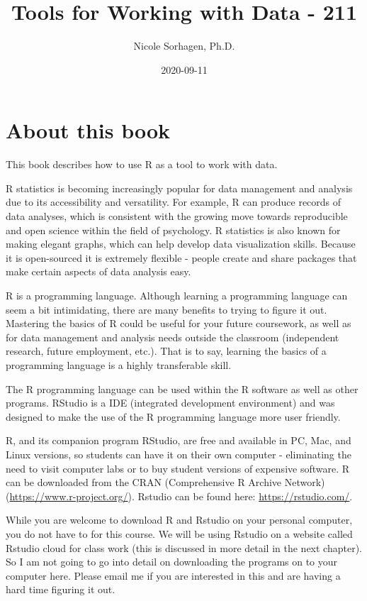\documentclass[
]{book}
\title{Tools for Working with Data - 211}
\author{Nicole Sorhagen, Ph.D.}
\date{2020-09-11}
\begin{document}
\maketitle

{
\setcounter{tocdepth}{1}
\tableofcontents
}
\hypertarget{about-this-book}{%
\chapter{About this book}\label{about-this-book}}

This book describes how to use R as a tool to work with data.

R statistics is becoming increasingly popular for data management and analysis due to its accessibility and versatility. For example, R can produce records of data analyses, which is consistent with the growing move towards reproducible and open science within the field of psychology. R statistics is also known for making elegant graphs, which can help develop data visualization skills. Because it is open-sourced it is extremely flexible - people create and share packages that make certain aspects of data analysis easy.

R is a programming language. Although learning a programming language can seem a bit intimidating, there are many benefits to trying to figure it out. Mastering the basics of R could be useful for your future coursework, as well as for data management and analysis needs outside the classroom (independent research, future employment, etc.). That is to say, learning the basics of a programming language is a highly transferable skill.

The R programming language can be used within the R software as well as other programs. RStudio is a IDE (integrated development environment) and was designed to make the use of the R programming language more user friendly.

R, and its companion program RStudio, are free and available in PC, Mac, and Linux versions, so students can have it on their own computer - eliminating the need to visit computer labs or to buy student versions of expensive software. R can be downloaded from the CRAN (Comprehensive R Archive Network) (\url{https://www.r-project.org/}). Rstudio can be found here: \url{https://rstudio.com/}.

While you are welcome to download R and Rstudio on your personal computer, you do not have to for this course. We will be using Rstudio on a website called Rstudio cloud for class work (this is discussed in more detail in the next chapter). So I am not going to go into detail on downloading the programs on to your computer here. Please email me if you are interested in this and are having a hard time figuring it out.
\end{document}
